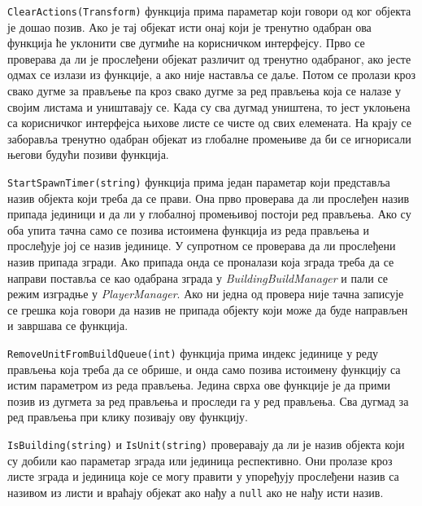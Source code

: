 \documentclass[11pt,a4paper]{article}
\begin{document}
\texttt{ClearActions(Transform)} функција прима параметар који говори од ког објекта је дошао позив. Ако је тај објекат исти онај који је тренутно одабран ова функција ће уклонити све дугмиће на корисничком интерфејсу. Прво се проверава да ли је прослеђени објекат различит од тренутно одабраног, ако јесте одмах се излази из функције, а ако није наставља се даље. Потом се пролази кроз свако дугме за прављење па кроз свако дугме за ред прављења која се налазе у својим листама и уништавају се. Када су сва дугмад уништена, то јест уклоњена са корисничког интерфејса њихове листе се чисте од свих елемената. На крају се заборавља тренутно одабран објекат из глобалне промењиве да би се игнорисали његови будући позиви функција.

\texttt{StartSpawnTimer(string)}  функција прима један параметар који представља назив објекта који треба да се прави. Она прво проверава да ли прослеђен назив припада јединици и да ли у глобалној промењивој постоји ред прављења. Ако су оба упита тачна само се позива истоимена функција из реда прављења и прослеђује јој се назив јединице. У супротном се проверава да ли прослеђени назив припада згради. Ако припада онда се проналази која зграда треба да се направи поставља се као одабрана зграда у \emph{BuildingBuildManager} и пали се режим изградње у \emph{PlayerManager}. Ако ни једна од провера није тачна записује се грешка која говори да назив не припада објекту који може да буде направљен и завршава се функција.

\texttt{RemoveUnitFromBuildQueue(int)} функција прима индекс јединице у реду прављења која треба да се обрише, и онда само позива истоимену функцију са истим параметром из реда прављења. Једина сврха ове функције је да прими позив из дугмета за ред прављења и проследи га у ред прављења. Сва дугмад за ред прављења при клику позивају ову функцију.

\texttt{IsBuilding(string)} и \texttt{IsUnit(string)} проверавају да ли је назив објекта који су добили као параметар зграда или јединица респективно. Они пролазе кроз листе  зграда и јединица које се могу правити у упоређују прослеђени назив са називом из листи и враћају објекат ако нађу а \texttt{null} ако не нађу исти назив.
\end{document}
